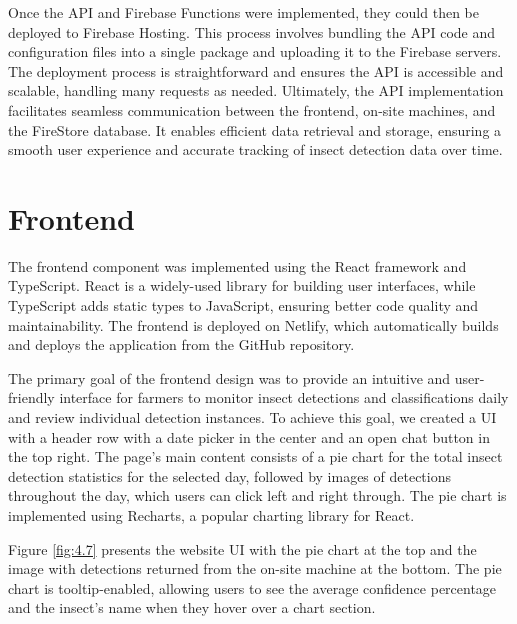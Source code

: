 Once the API and Firebase Functions were implemented, they could then be deployed to Firebase Hosting. This process involves bundling the API code and configuration files into a single package and uploading it to the Firebase servers. The deployment process is straightforward and ensures the API is accessible and scalable, handling many requests as needed. Ultimately, the API implementation facilitates seamless communication between the frontend, on-site machines, and the FireStore database. It enables efficient data retrieval and storage, ensuring a smooth user experience and accurate tracking of insect detection data over time.

\section{Frontend}

The frontend component was implemented using the React framework and TypeScript. React is a widely-used library for building user interfaces, while TypeScript adds static types to JavaScript, ensuring better code quality and maintainability. The frontend is deployed on Netlify, which automatically builds and deploys the application from the GitHub repository.

The primary goal of the frontend design was to provide an intuitive and user-friendly interface for farmers to monitor insect detections and classifications daily and review individual detection instances. To achieve this goal, we created a UI with a header row with a date picker in the center and an open chat button in the top right. The page's main content consists of a pie chart for the total insect detection statistics for the selected day, followed by images of detections throughout the day, which users can click left and right through. The pie chart is implemented using Recharts, a popular charting library for React.

Figure \ref{fig:4.7} presents the website UI with the pie chart at the top and the image with detections returned from the on-site machine at the bottom. The pie chart is tooltip-enabled, allowing users to see the average confidence percentage and the insect's name when they hover over a chart section.

